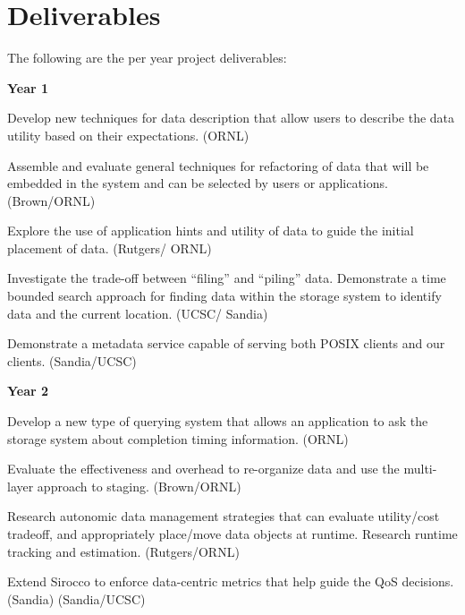 \section{Deliverables}
The following are the per year project deliverables:

\textbf{Year 1}
\begin{tightItemize}
\item Develop new techniques for data description that allow users to 
describe the data utility based on their expectations. (ORNL)

\item Assemble and evaluate general techniques for refactoring of data
that will be embedded in the system and can be selected by users or applications. (Brown/ORNL)
\item Explore the use of application hints and utility of data to guide the initial placement of data. 
(Rutgers/ ORNL)
\item Investigate the trade-off between ``filing'' and ``piling'' data. 
Demonstrate a time bounded search approach for finding data within the storage system
to identify data and the current location. (UCSC/ Sandia)
\item Demonstrate a metadata service capable of serving both POSIX clients and our clients. (Sandia/UCSC)
\end{tightItemize}

\textbf{Year 2}
\begin{tightItemize}
\item Develop a new type of querying system that allows an application to ask the storage system
about completion timing information. (ORNL)
\item Evaluate the effectiveness and overhead to re-organize data and use the multi-layer approach 
to staging. (Brown/ORNL)
\item Research autonomic data management strategies that
can evaluate utility/cost tradeoff, and appropriately place/move data objects at runtime. 
Research runtime tracking and estimation. (Rutgers/ORNL)
\item Extend Sirocco to enforce data-centric metrics that help guide the QoS decisions. (Sandia)
(Sandia/UCSC)
\end{tightItemize}


